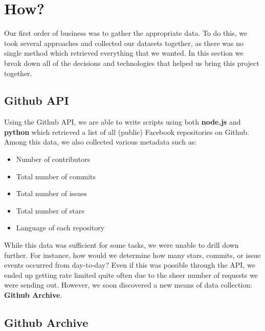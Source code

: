 \documentclass{article}
\begin{document}
\newpage

\section {How?}

Our first order of business was to gather the appropriate data. To do this, we took several approaches and collected our datasets together, as there was no single method which retrieved everything that we wanted. In this section we break down all of the decisions and technologies that helped us bring this project together.

\subsection {Github API}

Using the Github API, we are able to write scripts using both \textbf{node.js} and \textbf{python} which retrieved a list of all (public) Facebook repositories on Github. Among this data, we also collected various metadata such as:

\begin {itemize}
	\item Number of contributors
	\item Total number of commits
	\item Total number of issues
	\item Total number of stars
	\item Language of each repository
\end {itemize}

While this data was sufficient for some tasks, we were unable to drill down further. For instance, how would we determine how many stars, commits, or issue events occurred from day-to-day? Even if this was possible through the API, we ended up getting rate limited quite often due to the sheer number of requests we were sending out. However, we soon discovered a new means of data collection: \textbf{Github Archive}.

\subsection {Github Archive}
\end{document}

